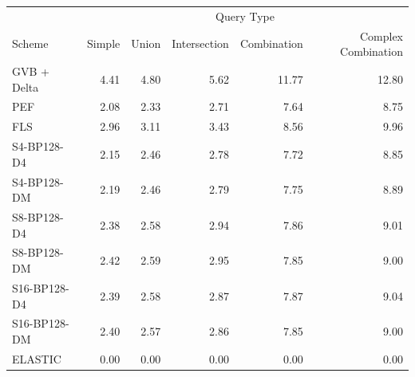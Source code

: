 \begin{tabular}{lrrrrr}
\toprule
 & \multicolumn{5}{c}{Query Type} \\
Scheme & Simple & Union & Intersection & Combination & Complex Combination \\
\midrule
GVB + Delta & 4.41 & 4.80 & 5.62 & 11.77 & 12.80 \\
PEF & 2.08 & 2.33 & 2.71 & 7.64 & 8.75 \\
FLS & 2.96 & 3.11 & 3.43 & 8.56 & 9.96 \\
S4-BP128-D4 & 2.15 & 2.46 & 2.78 & 7.72 & 8.85 \\
S4-BP128-DM & 2.19 & 2.46 & 2.79 & 7.75 & 8.89 \\
S8-BP128-D4 & 2.38 & 2.58 & 2.94 & 7.86 & 9.01 \\
S8-BP128-DM & 2.42 & 2.59 & 2.95 & 7.85 & 9.00 \\
S16-BP128-D4 & 2.39 & 2.58 & 2.87 & 7.87 & 9.04 \\
S16-BP128-DM & 2.40 & 2.57 & 2.86 & 7.85 & 9.00 \\
ELASTIC & 0.00 & 0.00 & 0.00 & 0.00 & 0.00 \\
\bottomrule
\end{tabular}
